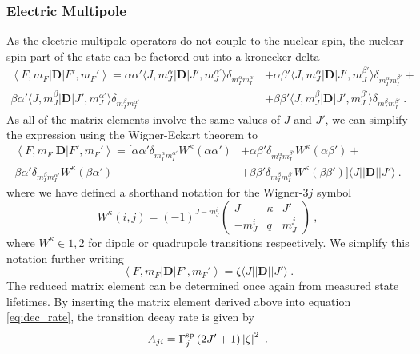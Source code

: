 \documentclass{article}
\begin{document}
\subsubsection{Electric Multipole}
As the electric multipole operators do not couple to the nuclear spin, the nuclear spin part of the state can be factored out into a kronecker delta 
\begin{equation}
\begin{split}
       \left\langle F, m_F\right|\mathbf{D}\left|F', m_F'\right\rangle = \alpha \alpha' \langle J,m_J^\alpha|\mathbf{D}|J', m_J^{\alpha'}\rangle \delta_{m_I^\alpha m_I^{\alpha'}} &+ \alpha \beta' \langle J,m_J^\alpha|\mathbf{D}|J', m_J^{\beta'}\rangle \delta_{m_I^\alpha m_I^{\beta'}} + \\ 
       \beta \alpha' \langle J,m_J^\beta|\mathbf{D}|J', m_J^{\alpha'}\rangle \delta_{m_I^\beta m_I^{\alpha'}} &+ \beta \beta' \langle J,m_J^\beta|\mathbf{D}|J', m_J^{\beta'}\rangle \delta_{m_I^\beta m_I^{\beta'}}~.
\end{split}
\end{equation}
As all of the matrix elements involve the same values of $J$ and $J'$, we can simplify the expression using the Wigner-Eckart theorem to
\begin{equation}
\begin{split}
       \left\langle F, m_F\right|\mathbf{D}\left|F', m_F'\right\rangle =  
       [ \alpha \alpha' \delta_{m_I^\alpha  m_I^{\alpha'}}  W^{\kappa}\left(\alpha \alpha'\right)  &+ \alpha \beta' \delta_{m_I^\alpha m_I^{\beta'}} 
       W^{\kappa}\left(\alpha \beta'\right) + \\
        \beta \alpha' \delta_{m_I^\beta m_I^{\alpha'}}
       W^{\kappa}\left(\beta \alpha'\right) &+ 
        \beta \beta' \delta_{m_I^\beta m_I^{\beta'}}
        W^{\kappa}\left(\beta \beta'\right) ] \langle J||\mathbf{D}||J'\rangle~.
\end{split}
\end{equation}
where we have defined a shorthand notation for the Wigner-$3j$ symbol
\begin{equation}
W^{\kappa}(i, j) = (-1)^{J- m_J^{i}} \begin{pmatrix}
        J & \kappa & J'\\
        -m_J^i & q & m_J^{j}
        \end{pmatrix}~,
\end{equation}
where $W^{\kappa} \in 1,2$ for dipole or quadrupole transitions respectively. We simplify this notation further writing
\begin{equation}
    \left\langle F, m_F\right|\mathbf{D}\left|F', m_F'\right\rangle = \zeta \langle J||\mathbf{D}||J'\rangle~.  
\end{equation}
The reduced matrix element can be determined once again from measured state lifetimes. By inserting the matrix element derived above into equation \ref{eq:dec_rate}, the transition decay rate is given by 
\begin{equation}
    A_{ji} = \Gamma^{\rm{sp}}_j \left(2J'+1\right) \left|\zeta\right|^2~.
\end{equation}
\end{document}
